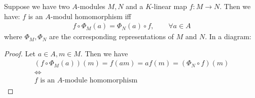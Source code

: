 \documentclass[]{article}
\begin{document}
\begin{remark}
    Suppose we have two \(A\)-modules \(M,N\) and a \(K\)-linear map \(f: M \rightarrow N\). Then we have: 
    \(f\) is an \(A\)-modul homomorphism iff
    \begin{align*}
        f \circ \Phi_M(a) = \Phi_N(a) \circ f, \qquad \forall a \in A
    \end{align*}
    where \(\Phi_M, \Phi_N\) are the corresponding representations of \(M\) and \(N\). In a diagram:
    \begin{center}
    \end{center}
\end{remark}
\begin{proof}
    Let \(a \in A, m \in M\). Then we have 
\begin{gather*}
    (f \circ \Phi_M(a))(m) = f(am) = a f(m) = ( \Phi_N \circ f )(m) \\
    \Longleftrightarrow \\
    f \text{ is an } A\text{-module homomorphism}
\end{gather*}
\end{proof}
\end{document}
